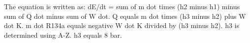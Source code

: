 The equation is written as:  
dE/dt = sum of m dot times (h2 minus h1) minus sum of Q dot minus sum of W dot.  
Q equals m dot times (h3 minus h2) plus W dot K.  
m dot R134a equals negative W dot K divided by (h3 minus h2).  
h3 is determined using A-Z.  
h3 equals 8 bar.